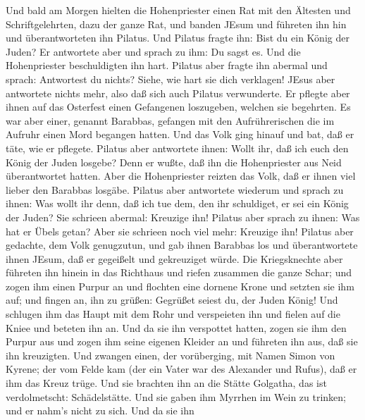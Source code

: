  Und bald am Morgen hielten die Hohenpriester einen Rat mit
den Ältesten und Schriftgelehrten, dazu der ganze Rat, und banden JEsum
und führeten ihn hin und überantworteten ihn Pilatus.  Und
Pilatus fragte ihn: Bist du ein König der Juden? Er antwortete aber und
sprach zu ihm: Du sagst es.  Und die Hohenpriester
beschuldigten ihn hart.  Pilatus aber fragte ihn abermal und
sprach: Antwortest du nichts? Siehe, wie hart sie dich verklagen!
 JEsus aber antwortete nichts mehr, also daß sich auch
Pilatus verwunderte.  Er pflegte aber ihnen auf das
Osterfest einen Gefangenen loszugeben, welchen sie begehrten.
 Es war aber einer, genannt Barabbas, gefangen mit den
Aufrührerischen die im Aufruhr einen Mord begangen hatten. 
Und das Volk ging hinauf und bat, daß er täte, wie er pflegete.
 Pilatus aber antwortete ihnen: Wollt ihr, daß ich euch den
König der Juden losgebe?  Denn er wußte, daß ihn die
Hohenpriester aus Neid überantwortet hatten.  Aber die
Hohenpriester reizten das Volk, daß er ihnen viel lieber den Barabbas
losgäbe.  Pilatus aber antwortete wiederum und sprach zu
ihnen: Was wollt ihr denn, daß ich tue dem, den ihr schuldiget, er sei
ein König der Juden?  Sie schrieen abermal: Kreuzige ihn!
 Pilatus aber sprach zu ihnen: Was hat er Übels getan? Aber
sie schrieen noch viel mehr: Kreuzige ihn!  Pilatus aber
gedachte, dem Volk genugzutun, und gab ihnen Barabbas los und
überantwortete ihnen JEsum, daß er gegeißelt und gekreuziget würde.
 Die Kriegsknechte aber führeten ihn hinein in das
Richthaus und riefen zusammen die ganze Schar;  und zogen
ihm einen Purpur an und flochten eine dornene Krone und setzten sie ihm
auf;  und fingen an, ihn zu grüßen: Gegrüßet seiest du, der
Juden König!  Und schlugen ihm das Haupt mit dem Rohr und
verspeieten ihn und fielen auf die Kniee und beteten ihn an.
 Und da sie ihn verspottet hatten, zogen sie ihm den Purpur
aus und zogen ihm seine eigenen Kleider an und führeten ihn aus, daß sie
ihn kreuzigten.  Und zwangen einen, der vorüberging, mit
Namen Simon von Kyrene; der vom Felde kam (der ein Vater war des
Alexander und Rufus), daß er ihm das Kreuz trüge.  Und sie
brachten ihn an die Stätte Golgatha, das ist verdolmetscht:
Schädelstätte.  Und sie gaben ihm Myrrhen im Wein zu
trinken; und er nahm's nicht zu sich.  Und da sie ihn
